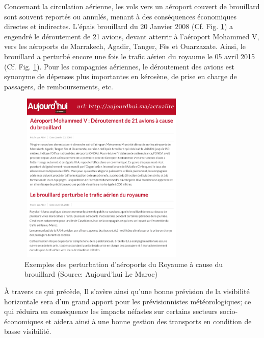 Concernant la circulation aérienne, les vols vers un aéroport couvert de brouillard sont souvent reportés ou annulés, menant à des conséquences économiques directes et indirectes.  L’épais brouillard du 20 Janvier 2008 (Cf. Fig. \ref{aujour}) a engendré le
déroutement de 21 avions, devant atterrir à l’aéroport Mohammed V, vers les aéroports de Marrakech, Agadir, Tanger, Fès et Ouarzazate. 
Ainsi, le brouillard a perturbé encore une fois le trafic aérien du royaume le 05 avril 2015 (Cf. Fig. \ref{aujour}). Pour les compagnies aériennes, le déroutement
des avions est synonyme de dépenses plus importantes en kérosène, de prise en charge de passagers, de
remboursements, etc.\\
\begin{figure}[!h]
\parbox{9cm}{
\centering
\includegraphics[width=8cm, height=8.2cm]{img/aujourd.png}
}
\parbox{5cm}{
\caption{ Exemples des perturbation d'aéroports du Royaume à cause du brouillard (Source: Aujourd’hui Le Maroc)}
\label{aujour}
}
\end{figure}

À travers ce qui précède, Il s'avère ainsi qu'une bonne prévision de la visibilité horizontale sera d'un grand apport pour les prévisionnistes météorologiques; ce qui réduira en conséquence les impacts néfastes sur certains secteurs socio-économiques et aidera ainsi à une bonne gestion des transports en condition de basse visibilité.


\newpage
